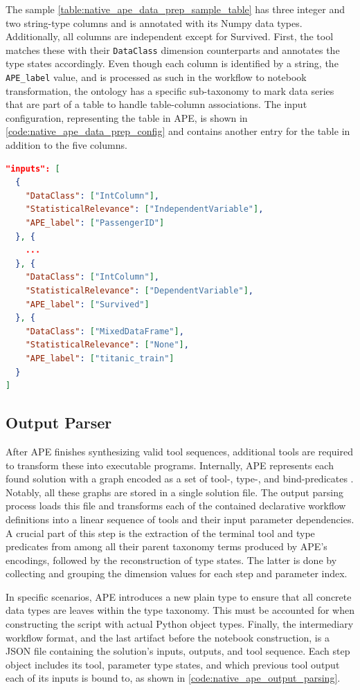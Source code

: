 The sample \autoref{table:native_ape_data_prep_sample_table} has three integer and two string-type columns and is annotated with its Numpy data types. Additionally, all columns are independent except for Survived. First, the tool matches these with their \verb|DataClass| dimension counterparts and annotates the type states accordingly. Even though each column is identified by a string, the \verb|APE_label| value, and is processed as such in the workflow to notebook transformation, the ontology has a specific sub-taxonomy to mark data series that are part of a table to handle table-column associations. The input configuration, representing the table in APE, is shown in \autoref{code:native_ape_data_prep_config} and contains another entry for the table in addition to the five columns.
\begin{lstlisting}[language=json, caption=Input Config for Sample Table., label=code:native_ape_data_prep_config]
"inputs": [
  {
    "DataClass": ["IntColumn"],
    "StatisticalRelevance": ["IndependentVariable"],
    "APE_label": ["PassengerID"]
  }, {
    ...
  }, {
    "DataClass": ["IntColumn"],
    "StatisticalRelevance": ["DependentVariable"],
    "APE_label": ["Survived"]
  }, {
    "DataClass": ["MixedDataFrame"],
    "StatisticalRelevance": ["None"],
    "APE_label": ["titanic_train"]
  }
]
\end{lstlisting}

\subsection{Output Parser}
After APE finishes synthesizing valid tool sequences, additional tools are required to transform these into executable programs. Internally, APE represents each found solution with a graph encoded as a set of tool-, type-, and bind-predicates \cite{kasalica2022synthesis}. Notably, all these graphs are stored in a single solution file. The output parsing process loads this file and transforms each of the contained declarative workflow definitions into a linear sequence of tools and their input parameter dependencies. A crucial part of this step is the extraction of the terminal tool and type predicates from among all their parent taxonomy terms produced by APE's encodings, followed by the reconstruction of type states. The latter is done by collecting and grouping the dimension values for each step and parameter index.

In specific scenarios, APE introduces a new plain type to ensure that all concrete data types are leaves within the type taxonomy. This must be accounted for when constructing the script with actual Python object types. Finally, the intermediary workflow format, and the last artifact before the notebook construction, is a JSON file containing the solution’s inputs, outputs, and tool sequence. Each step object includes its tool, parameter type states, and which previous tool output each of its inputs is bound to, as shown in \autoref{code:native_ape_output_parsing}.

